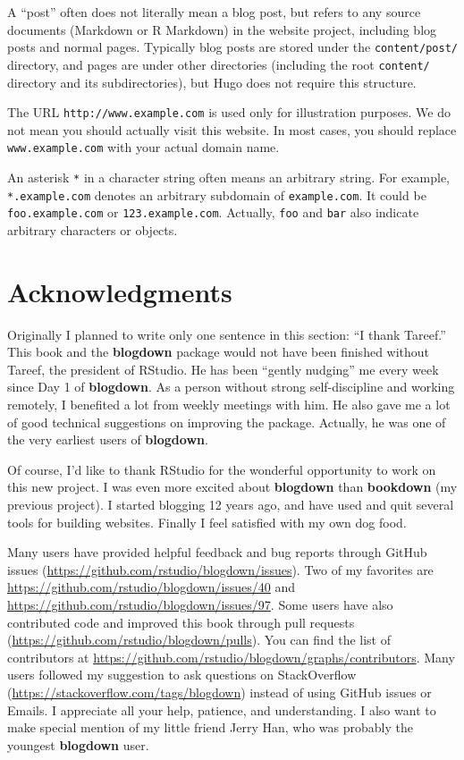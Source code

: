 \documentclass[
  12pt,
]{krantz}
\begin{document}
A ``post'' often does not literally mean a blog post, but refers to any source documents (Markdown or R Markdown) in the website project, including blog posts and normal pages. Typically blog posts are stored under the \texttt{content/post/} directory, and pages are under other directories (including the root \texttt{content/} directory and its subdirectories), but Hugo does not require this structure.

The URL \texttt{http://www.example.com} is used only for illustration purposes. We do not mean you should actually visit this website. In most cases, you should replace \texttt{www.example.com} with your actual domain name.

An asterisk \texttt{*} in a character string often means an arbitrary string. For example, \texttt{*.example.com} denotes an arbitrary subdomain of \texttt{example.com}. It could be \texttt{foo.example.com} or \texttt{123.example.com}. Actually, \texttt{foo} and \texttt{bar} also indicate arbitrary characters or objects.

\hypertarget{acknowledgments}{%
\section*{Acknowledgments}\label{acknowledgments}}


Originally I planned to write only one sentence in this section: ``I thank Tareef.'' This book and the \textbf{blogdown} package would not have been finished without Tareef, the president of RStudio. He has been ``gently nudging'' me every week since Day 1 of \textbf{blogdown}. As a person without strong self-discipline and working remotely, I benefited a lot from weekly meetings with him. He also gave me a lot of good technical suggestions on improving the package. Actually, he was one of the very earliest users of \textbf{blogdown}.

Of course, I'd like to thank RStudio for the wonderful opportunity to work on this new project. I was even more excited about \textbf{blogdown} than \textbf{bookdown} (my previous project). I started blogging 12 years ago, and have used and quit several tools for building websites. Finally I feel satisfied with my own dog food.

Many users have provided helpful feedback and bug reports through GitHub issues (\url{https://github.com/rstudio/blogdown/issues}). Two of my favorites are \url{https://github.com/rstudio/blogdown/issues/40} and \url{https://github.com/rstudio/blogdown/issues/97}. Some users have also contributed code and improved this book through pull requests (\url{https://github.com/rstudio/blogdown/pulls}). You can find the list of contributors at \url{https://github.com/rstudio/blogdown/graphs/contributors}. Many users followed my suggestion to ask questions on StackOverflow (\url{https://stackoverflow.com/tags/blogdown}) instead of using GitHub issues or Emails. I appreciate all your help, patience, and understanding. I also want to make special mention of my little friend Jerry Han, who was probably the youngest \textbf{blogdown} user.
\end{document}
